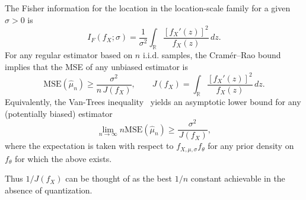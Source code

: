 \documentclass[10pt]{article} %
\newcommand{\iid}{\text{i.i.d.}}
\theoremstyle{plain}
\theoremstyle{definition}
\theoremstyle{remark}
\newcommand{\svcomment}[1]{\textcolor{red}{SV: #1}}
\begin{document}
The Fisher information for the location in the location-scale family for a given $\sigma>0$ is
\[
I_{F}(f_X;\sigma)
=
\frac{1}{\sigma^{2}}
\int_{\mathbb{R}}
\frac{[f_X'(z)]^{2}}{f_X(z)}\,dz.
\]
For any regular estimator based on $n$ $\iid$ samples, the Cram\'{e}r–Rao bound implies that the MSE of any unbiased estimator is 
\[
\mathrm{MSE}(\hat\mu_n)
\ge
\frac{\sigma^{2}}{n\,J(f_X)},
\qquad
J(f_X)
= \int_{\mathbb{R}} \frac{[f_X'(z)]^{2}}{f_X(z)}\,dz.
\]
Equivalently, the Van-Trees inequality~\citep{bj/1186078362} yields an asymptotic lower bound for any (potentially biased) estimator  
\[
\lim_{n\to\infty}n\mathrm{MSE}(\hat\mu_n)
\ge
\frac{\sigma^{2}}{\,J(f_X)},
\]
where the expectation is taken with respect to $f_{X,\mu,\sigma}f_{\theta}$ for any prior density on $f_{\theta}$ for which the above exists.

Thus $1/J(f_X)$ can be thought of as the best $1/n$ constant achievable in the absence of quantization.

\end{document}
